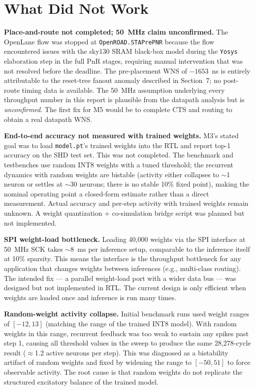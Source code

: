 \documentclass[11pt,letterpaper]{article}
\begin{document}
\section{What Did Not Work}

\textbf{Place-and-route not completed; 50~MHz claim unconfirmed.}
The OpenLane flow was stopped at \texttt{OpenROAD.STAPrePNR} because the flow
encountered issues with the sky130 SRAM black-box model during the \texttt{Yosys}
elaboration step in the full PnR stages, requiring manual intervention that was
not resolved before the deadline. The pre-placement WNS of $-1653$~ns is
entirely attributable to the reset-tree fanout anomaly described in Section~7;
no post-route timing data is available. The 50~MHz assumption underlying every
throughput number in this report is plausible from the datapath analysis but
is \emph{unconfirmed}. The first fix for M5 would be to complete CTS and routing
to obtain a real datapath WNS.

\textbf{End-to-end accuracy not measured with trained weights.}
M3's stated goal was to load \texttt{model.pt}'s trained weights into the RTL
and report top-1 accuracy on the SHD test set. This was not completed. The
benchmark and testbenches use random INT8 weights with a tuned threshold; the
recurrent dynamics with random weights are bistable (activity either collapses to
$\sim$1 neuron or settles at $\sim$30 neurons; there is no stable 10\% fixed
point), making the nominal operating point a closed-form estimate rather than a
direct measurement. Actual accuracy and per-step activity with trained weights
remain unknown. A weight quantization + co-simulation bridge script was planned
but not implemented.

\textbf{SPI weight-load bottleneck.}
Loading 40,000 weights via the SPI interface at 50~MHz SCK takes $\sim$8~ms per
inference setup, comparable to the inference itself at 10\% sparsity. This means
the interface is the throughput bottleneck for any application that changes
weights between inferences (e.g., multi-class routing). The intended fix --- a
parallel weight-load port with a wider data bus --- was designed but not
implemented in RTL. The current design is only efficient when weights are loaded
once and inference is run many times.

\textbf{Random-weight activity collapse.}
Initial benchmark runs used weight ranges of $[-12, 13]$ (matching the range of
the trained INT8 model). With random weights in this range, recurrent feedback
was too weak to sustain any spikes past step 1, causing all threshold values in
the sweep to produce the same 28,278-cycle result ($\approx$1.2 active neurons
per step). This was diagnosed as a bistability artifact of random weights and
fixed by widening the range to $[-50, 51]$ to force observable activity. The
root cause is that random weights do not replicate the structured excitatory
balance of the trained model.
\end{document}
